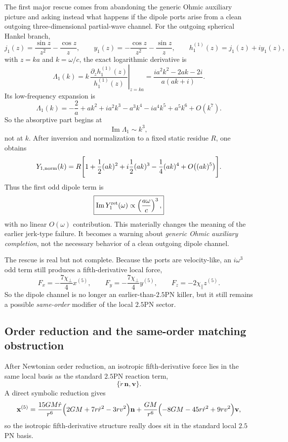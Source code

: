 \documentclass[11pt]{article}
\begin{document}
The first major rescue comes from abandoning the generic Ohmic auxiliary picture
and asking instead what happens if the dipole ports arise from a clean outgoing
three-dimensional partial-wave channel.  For the outgoing spherical Hankel
branch,
\[
j_1(z)=\frac{\sin z}{z^2}-\frac{\cos z}{z},
\qquad
y_1(z)=-\frac{\cos z}{z^2}-\frac{\sin z}{z},
\qquad
h_1^{(1)}(z)=j_1(z)+iy_1(z),
\]
with $z=ka$ and $k=\omega/c$, the exact logarithmic derivative is
\[
\Lambda_1(k)
=
\left.k\,\frac{\partial_z h_1^{(1)}(z)}{h_1^{(1)}(z)}\right|_{z=ka}
=
\frac{i a^2 k^2-2ak-2i}{a(ak+i)}.
\]
Its low-frequency expansion is
\[
\Lambda_1(k)
=
-\frac{2}{a}
+ak^2
+ia^2k^3
-a^3k^4
-ia^4k^5
+a^5k^6
+O(k^7).
\]
So the absorptive part begins at
\[
\operatorname{Im}\Lambda_1\sim k^3,
\]
not at $k$.  After inversion and normalization to a fixed static residue $R$,
one obtains
\[
Y_{1,{\rm norm}}(k)
=
R\Bigg[
1+\frac12(ak)^2+i\frac12(ak)^3-\frac14(ak)^4+O\bigl((ak)^5\bigr)
\Bigg].
\]
Thus the first odd dipole term is
\[
\boxed{
\operatorname{Im} Y_1^{\rm ret}(\omega)
\propto
\left(\frac{a\omega}{c}\right)^3,
}
\]
with no linear $O(\omega)$ contribution.  This materially changes the meaning
of the earlier jerk-type failure.  It becomes a warning about \emph{generic
Ohmic auxiliary completion}, not the necessary behavior of a clean outgoing
dipole channel.

The rescue is real but not complete.  Because the ports are velocity-like, an
$i\omega^3$ odd term still produces a fifth-derivative local force,
\[
F_x=-\frac{7\chi_\perp}{4}x^{(5)},
\qquad
F_y=-\frac{7\chi_\perp}{4}y^{(5)},
\qquad
F_z=-2\chi_\parallel z^{(5)}.
\]
So the dipole channel is no longer an earlier-than-$2.5$PN killer, but it still
remains a possible \emph{same-order} modifier of the local $2.5$PN sector.

\subsection{Order reduction and the same-order matching obstruction}
\label{app:dipole-ledger-matching}

After Newtonian order reduction, an isotropic fifth-derivative force lies in
the same local basis as the standard $2.5$PN reaction term,
\[
\{\dot r\,\mathbf n,\mathbf v\}.
\]
A direct symbolic reduction gives
\[
\mathbf x^{(5)}
=
\frac{15GM\dot r}{r^6}\Bigl(2GM+7r\dot r^2-3rv^2\Bigr)\mathbf n
+
\frac{GM}{r^6}\Bigl(-8GM-45r\dot r^2+9rv^2\Bigr)\mathbf v,
\]
so the isotropic fifth-derivative structure really does sit in the standard
local $2.5$PN basis.
\end{document}
